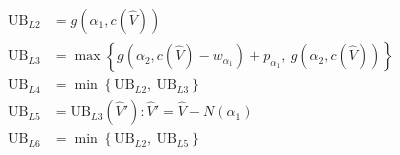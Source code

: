\documentclass{article}
\begin{document}
\begin{align*}
\mathrm{UB}_{L2} &= g(\alpha_1, c(\hat{V})) \\
\mathrm{UB}_{L3} &= \max\left\{g(\alpha_2, c(\hat{V}) - w_{\alpha_1}) + p_{\alpha_1},\ g(\alpha_2, c(\hat{V}))\right\} \\
\mathrm{UB}_{L4} &= \min\left\{\mathrm{UB}_{L2},\ \mathrm{UB}_{L3}\right\} \\
\mathrm{UB}_{L5} &= \mathrm{UB}_{L3}(\hat{V}') : \hat{V}' = \hat{V} - N(\alpha_1) \\
\mathrm{UB}_{L6} &= \min\left\{\mathrm{UB}_{L2},\ \mathrm{UB}_{L5}\right\}
\end{align*}








\end{document}
